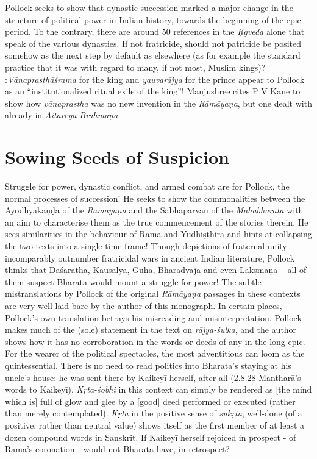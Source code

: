 Pollock seeks to show that dynastic succession marked a major change in the structure of political power in Indian history, towards the beginning of the epic period. To the contrary, there are around 50 references in the {\sl Ṛgveda} alone that speak of the various dynasties. If not fratricide, should not patricide be posited somehow as the next step by default as elsewhere (as for example the standard practice that it was with regard to many, if not most, Muslim kings)? :{\sl Vānaprasthāśrama} for the king and {\sl yauvarājya} for the prince appear to Pollock as an “institutionalized ritual exile of the king”! Manjushree cites P V Kane to show how {\sl vānaprastha} was no new invention in the {\sl Rāmāyaṇa}, but one dealt with already in {\sl Aitareya Brāhmaṇa}.

\section*{Sowing Seeds of Suspicion}

Struggle for power, dynastic conflict, and armed combat are for Pollock, the normal processes of succession! He seeks to show the commonalities between the Ayodhyākāṇḍa of the {\sl Rāmāyaṇa} and the Sabhāparvan of the {\sl Mahābhārata} with an aim to characterise them as the true commencement of the stories therein. He sees similarities in the behaviour of Rāma and Yudhiṣṭhira and hints at collapsing the two texts into a single time-frame! Though depictions of fraternal unity incomparably outnumber fratricidal wars in ancient Indian literature, Pollock thinks that Daśaratha, Kausalyā, Guha, Bharadvāja and even Lakṣmaṇa -- all of them suspect Bharata would mount a struggle for power! The subtle mistranslations by Pollock of the original {\sl Rāmāyaṇa} passages in these contexts are very well laid bare by the author of this monograph. In certain places, Pollock's own translation betrays his misreading and misinterpretation. Pollock makes much of the (sole) statement in the text on {\sl rājya-śulka}, and the author shows how it has no corroboration in the words or deeds of any in the long epic. For the wearer of the political spectacles, the most adventitious can loom as the quintessential. There is no need to read politics into Bharata's staying at his uncle's house: he was sent there by Kaikeyī herself, after all (2.8.28 Mantharā's words to Kaikeyī). {\sl Kṛta-śobhi} in this context can simply be rendered as [the mind which is] full of glow and glee by a [good] deed performed or executed (rather than merely contemplated). {\sl Kṛta} in the positive sense of {\sl sukṛta}, well-done (of a positive, rather than neutral value) shows itself as the first member of at least a dozen compound words in Sanskrit. If Kaikeyī herself rejoiced in prospect - of Rāma's coronation - would not Bharata have, in retrospect?

